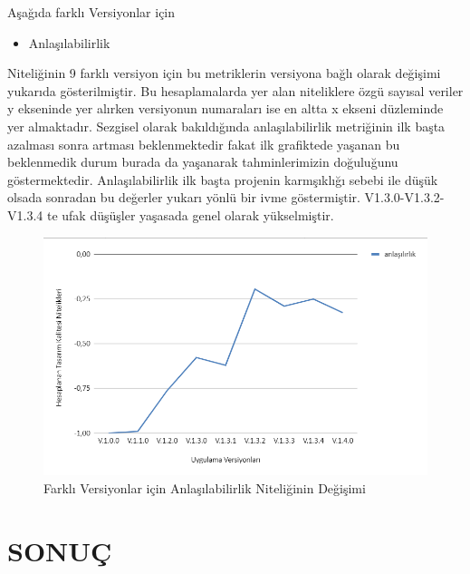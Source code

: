 \documentclass[conference]{IEEEtran}
\begin{document}
Aşağıda farklı Versiyonlar için 
\begin{itemize}
\item Anlaşılabilirlik
\end{itemize}
Niteliğinin  9 farklı versiyon için  bu metriklerin versiyona bağlı olarak değişimi yukarıda gösterilmiştir. Bu hesaplamalarda yer alan niteliklere özgü sayısal veriler y ekseninde yer alırken versiyonun numaraları ise en altta x ekseni düzleminde yer almaktadır. Sezgisel olarak bakıldığında anlaşılabilirlik metriğinin ilk başta azalması sonra artması beklenmektedir fakat  ilk grafiktede yaşanan bu beklenmedik durum burada da yaşanarak tahminlerimizin doğuluğunu göstermektedir. Anlaşılabilirlik ilk başta projenin karmşıklığı sebebi ile düşük olsada sonradan bu değerler yukarı yönlü bir ivme göstermiştir.  V1.3.0-V1.3.2-V1.3.4 te ufak düşüşler yaşasada genel olarak yükselmiştir.
\begin{figure}[h]
	\centering
\includegraphics[scale=0.515]{grafik2.png}
	\caption{Farklı Versiyonlar için Anlaşılabilirlik Niteliğinin Değişimi}
	\label{Grafik2}
\end{figure}

\vspace{500}
\section{SONUÇ}
\end{document}
